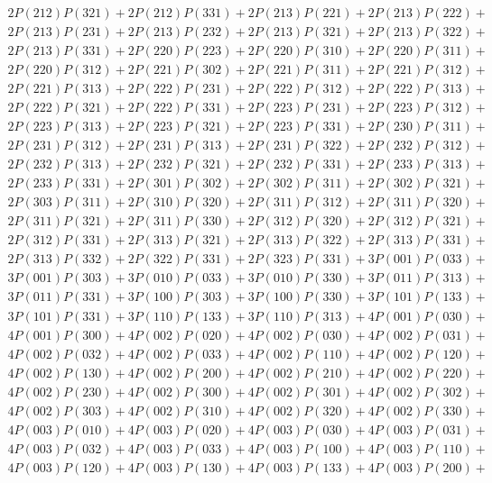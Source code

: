 \begin{align*}
	2P(212)P(321) + 2P(212)P(331) + 2P(213)P(221) + 2P(213)P(222)+ \\ 
	2P(213)P(231) + 2P(213)P(232) + 2P(213)P(321) + 2P(213)P(322)+ \\ 
	2P(213)P(331) + 2P(220)P(223) + 2P(220)P(310) + 2P(220)P(311)+ \\ 
	2P(220)P(312) + 2P(221)P(302) + 2P(221)P(311) + 2P(221)P(312)+ \\ 
	2P(221)P(313) + 2P(222)P(231) + 2P(222)P(312) + 2P(222)P(313)+ \\ 
	2P(222)P(321) + 2P(222)P(331) + 2P(223)P(231) + 2P(223)P(312)+ \\ 
	2P(223)P(313) + 2P(223)P(321) + 2P(223)P(331) + 2P(230)P(311)+ \\ 
	2P(231)P(312) + 2P(231)P(313) + 2P(231)P(322) + 2P(232)P(312)+ \\ 
	2P(232)P(313) + 2P(232)P(321) + 2P(232)P(331) + 2P(233)P(313)+ \\ 
	2P(233)P(331) + 2P(301)P(302) + 2P(302)P(311) + 2P(302)P(321)+ \\ 
	2P(303)P(311) + 2P(310)P(320) + 2P(311)P(312) + 2P(311)P(320)+ \\ 
	2P(311)P(321) + 2P(311)P(330) + 2P(312)P(320) + 2P(312)P(321)+ \\ 
	2P(312)P(331) + 2P(313)P(321) + 2P(313)P(322) + 2P(313)P(331)+ \\ 
	2P(313)P(332) + 2P(322)P(331) + 2P(323)P(331) + 3P(001)P(033)+ \\ 
	3P(001)P(303) + 3P(010)P(033) + 3P(010)P(330) + 3P(011)P(313)+ \\ 
	3P(011)P(331) + 3P(100)P(303) + 3P(100)P(330) + 3P(101)P(133)+ \\ 
	3P(101)P(331) + 3P(110)P(133) + 3P(110)P(313) + 4P(001)P(030)+ \\ 
	4P(001)P(300) + 4P(002)P(020) + 4P(002)P(030) + 4P(002)P(031)+ \\ 
	4P(002)P(032) + 4P(002)P(033) + 4P(002)P(110) + 4P(002)P(120)+ \\ 
	4P(002)P(130) + 4P(002)P(200) + 4P(002)P(210) + 4P(002)P(220)+ \\ 
	4P(002)P(230) + 4P(002)P(300) + 4P(002)P(301) + 4P(002)P(302)+ \\ 
	4P(002)P(303) + 4P(002)P(310) + 4P(002)P(320) + 4P(002)P(330)+ \\ 
	4P(003)P(010) + 4P(003)P(020) + 4P(003)P(030) + 4P(003)P(031)+ \\ 
	4P(003)P(032) + 4P(003)P(033) + 4P(003)P(100) + 4P(003)P(110)+ \\ 
	4P(003)P(120) + 4P(003)P(130) + 4P(003)P(133) + 4P(003)P(200)+ \\ 

\end{align*}
